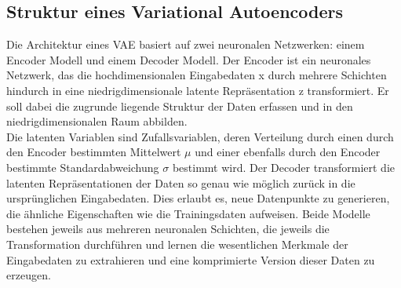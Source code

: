 \documentclass[%
thesis=student,%
coverpage=false,%
titlepage=false,%
headmarks=true, %
german,%
font=libertine, %
math=newpxtx, %
BCOR=5mm,%
coverBCOR=11mm%
]{tumbook}
\theoremstyle{break}
\begin{document}
\subsection{Struktur eines Variational Autoencoders}
Die Architektur eines VAE basiert auf zwei neuronalen Netzwerken: einem Encoder Modell und einem Decoder Modell. Der Encoder ist ein neuronales Netzwerk, das die hochdimensionalen Eingabedaten x durch mehrere Schichten hindurch in eine niedrigdimensionale latente Repräsentation z transformiert. Er soll dabei die zugrunde liegende Struktur der Daten erfassen und in den niedrigdimensionalen Raum abbilden.\\
Die latenten Variablen sind Zufallsvariablen, deren Verteilung durch einen durch den Encoder bestimmten Mittelwert $\mu$ und einer ebenfalls durch den Encoder bestimmte Standardabweichung $\sigma$ bestimmt wird. Der Decoder transformiert die latenten Repräsentationen der Daten so genau wie möglich zurück in die ursprünglichen Eingabedaten. Dies erlaubt es, neue Datenpunkte zu generieren, die ähnliche Eigenschaften wie die Trainingsdaten aufweisen. Beide Modelle bestehen jeweils aus mehreren neuronalen Schichten, die jeweils die Transformation durchführen und lernen die wesentlichen Merkmale der Eingabedaten zu extrahieren und eine komprimierte Version dieser Daten zu erzeugen.\\
\\
\end{document}
